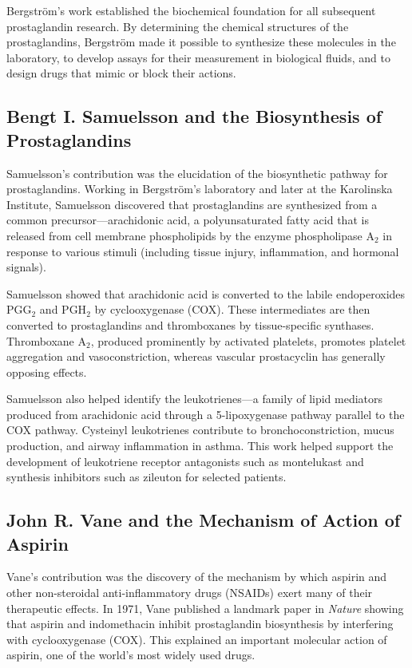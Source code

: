 Bergstr\"om's work established the biochemical foundation for all subsequent prostaglandin research. By determining the chemical structures of the prostaglandins, Bergstr\"om made it possible to synthesize these molecules in the laboratory, to develop assays for their measurement in biological fluids, and to design drugs that mimic or block their actions.

\subsection{Bengt I. Samuelsson and the Biosynthesis of Prostaglandins}

Samuelsson's contribution was the elucidation of the biosynthetic pathway for prostaglandins. Working in Bergstr\"om's laboratory and later at the Karolinska Institute, Samuelsson discovered that prostaglandins are synthesized from a common precursor---arachidonic acid, a polyunsaturated fatty acid that is released from cell membrane phospholipids by the enzyme phospholipase A$_2$ in response to various stimuli (including tissue injury, inflammation, and hormonal signals).

Samuelsson showed that arachidonic acid is converted to the labile endoperoxides PGG$_2$ and PGH$_2$ by cyclooxygenase (COX). These intermediates are then converted to prostaglandins and thromboxanes by tissue-specific synthases. Thromboxane A$_2$, produced prominently by activated platelets, promotes platelet aggregation and vasoconstriction, whereas vascular prostacyclin has generally opposing effects.

Samuelsson also helped identify the leukotrienes---a family of lipid mediators produced from arachidonic acid through a 5-lipoxygenase pathway parallel to the COX pathway. Cysteinyl leukotrienes contribute to bronchoconstriction, mucus production, and airway inflammation in asthma. This work helped support the development of leukotriene receptor antagonists such as montelukast and synthesis inhibitors such as zileuton for selected patients.

\subsection{John R. Vane and the Mechanism of Action of Aspirin}

Vane's contribution was the discovery of the mechanism by which aspirin and other non-steroidal anti-inflammatory drugs (NSAIDs) exert many of their therapeutic effects. In 1971, Vane published a landmark paper in \emph{Nature} showing that aspirin and indomethacin inhibit prostaglandin biosynthesis by interfering with cyclooxygenase (COX). This explained an important molecular action of aspirin, one of the world's most widely used drugs.

